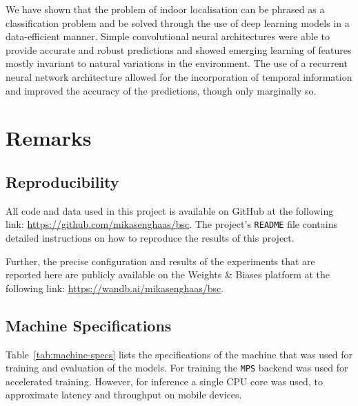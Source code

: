 \documentclass[a4paper]{article}
\begin{document}
  We have shown that the problem of indoor localisation can be phrased as a
  classification problem and be solved through the use of deep learning models
  in a data-efficient manner.
  Simple convolutional neural architectures were able to provide accurate and
  robust predictions and showed emerging learning of features mostly invariant
  to natural variations in the environment.
  The use of a recurrent neural network architecture allowed for the
  incorporation of temporal information and improved the accuracy of the
  predictions, though only marginally so.


  \section{Remarks} %
  \label{sec:remarks}

  \subsection{Reproducibility} %
  \label{sub:reproducibility}

  All code and data used in this project is available on GitHub at the
  following link: \url{https://github.com/mikasenghaas/bsc}. The project's 
  \texttt{README} file contains detailed instructions on how to reproduce the
  results of this project.

  Further, the precise configuration and results of the experiments that are
  reported here are publicly available on the Weights \& Biases platform at the
  following link: \url{https://wandb.ai/mikasenghaas/bsc}.


  \subsection{Machine Specifications} %
  \label{sub:machine-specs}

  Table~\ref{tab:machine-specs} lists the specifications of the machine that was
  used for training and evaluation of the models. For training the \texttt{MPS}
  backend was used for accelerated training. However, for inference a single CPU
  core was used, to approximate latency and throughput on mobile devices.
\end{document}
